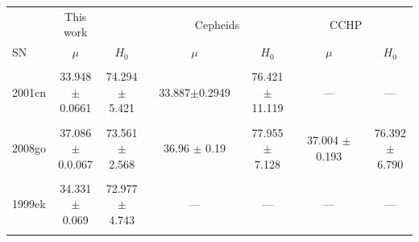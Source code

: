 \documentclass[11pt]{article}
\begin{document}
\begin{table}[htbp]
{\begin{tabular}{lcccccc}
     & This work &  & \ \ \ \ \ \ \ \  Cepheids & & \ \ \ \ \
    \  CCHP &   \\

    SN & $\mu$ & $H_{0}$ & $\mu$  & $H_{0}$ & $\mu$ & $H_{0}$ \\

    \hline 
    &&&&&& \\
    2001cn &  33.948 $\pm$ 0.0661  & 74.294$\pm$5.421 & 33.887$\pm$0.2949 &
    76.421 $\pm$ 11.119 &  ---    &  ---  \\
    &&&&&& \\
    2008go & 37.086$\pm$0.0.067 & 73.561 $\pm$ 2.568 &  36.96 $\pm$ 0.19 
    &  77.955 $\pm$  7.128      &  37.004 $\pm$ 0.193  &  76.392 $\pm$
     6.790   \\
    &&&&&& \\
    1999ek & 34.331$\pm$  0.069 & 72.977 $\pm$ 4.743 & --- & ---
     & --- & --- \\
    &&&&&&  \\
    \hline 

   \end{tabular}
}
\end{table}
\end{document}
